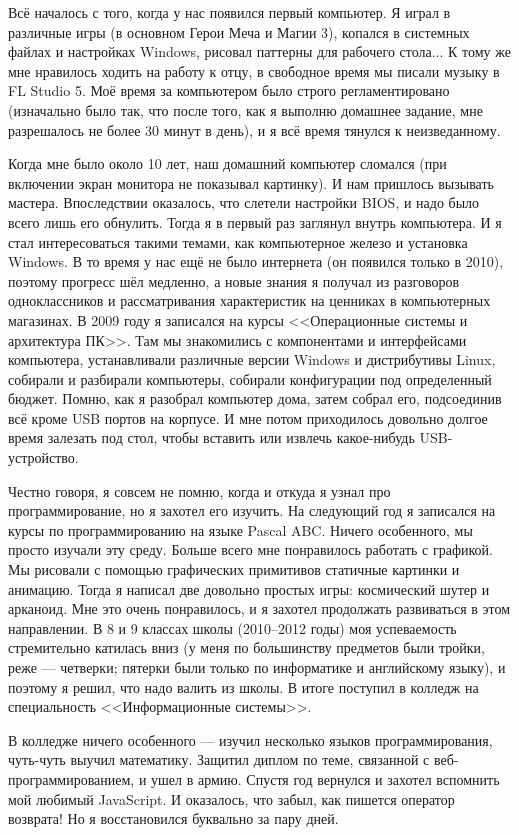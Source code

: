 \documentclass[14pt,a4paper,oneside]{extbook}
\begin{document}
		Всё началось с того, когда у нас появился первый компьютер. Я играл в различные игры (в основном Герои Меча и Магии 3), копался в системных файлах и настройках Windows, рисовал паттерны для рабочего стола... К тому же мне нравилось ходить на работу к отцу, в свободное время мы писали музыку в FL Studio 5. Моё время за компьютером было строго регламентировано (изначально было так, что после того, как я выполню домашнее задание, мне разрешалось не более 30 минут в день), и я всё время тянулся к неизведанному.
		
		Когда мне было около 10 лет, наш домашний компьютер сломался (при включении экран монитора не показывал картинку). И нам пришлось вызывать мастера. Впоследствии оказалось, что слетели настройки BIOS, и надо было всего лишь его обнулить. Тогда я в первый раз заглянул внутрь компьютера. И я стал интересоваться такими темами, как компьютерное железо и установка Windows. В то время у нас ещё не было интернета (он появился только в 2010), поэтому прогресс шёл медленно, а новые знания я получал из разговоров одноклассников и рассматривания характеристик на ценниках в компьютерных магазинах.
		В 2009 году я записался на курсы <<Операционные системы и архитектура ПК>>. Там мы знакомились с компонентами и интерфейсами компьютера, устанавливали различные версии Windows и дистрибутивы Linux, собирали и разбирали компьютеры, собирали конфигурации под определенный бюджет. Помню, как я разобрал компьютер дома, затем собрал его, подсоединив всё кроме USB портов на корпусе. И мне потом приходилось довольно долгое время залезать под стол, чтобы вставить или извлечь какое-нибудь USB-устройство.
		
		Честно говоря, я совсем не помню, когда и откуда я узнал про программирование, но я захотел его изучить. На следующий год я записался на курсы по программированию на языке Pascal ABC. Ничего особенного, мы просто изучали эту среду. Больше всего мне понравилось работать с графикой. Мы рисовали с помощью графических примитивов статичные картинки и анимацию. Тогда я написал две довольно простых игры: космический шутер и арканоид. Мне это очень понравилось, и я захотел продолжать развиваться в этом направлении.
		В 8 и 9 классах школы (2010--2012 годы) моя успеваемость стремительно катилась вниз (у меня по большинству предметов были тройки, реже --- четверки; пятерки были только по информатике и английскому языку), и поэтому я решил, что надо валить из школы. В итоге поступил в колледж на специальность <<Информационные системы>>.
		
		В колледже ничего особенного --- изучил несколько языков программирования, чуть-чуть выучил математику. Защитил диплом по теме, связанной с веб-программированием, и ушел в армию. Спустя год вернулся и захотел вспомнить мой любимый JavaScript. И оказалось, что забыл, как пишется оператор возврата! Но я восстановился буквально за пару дней.
		
\end{document}
